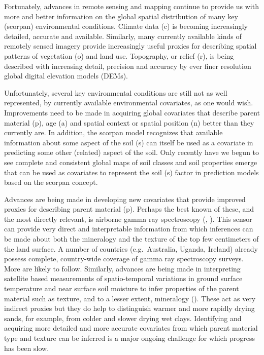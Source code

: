 \documentclass[graybox,natbib,nospthms,UStrade]{svmono}
\begin{document}
Fortunately, advances in remote sensing and mapping continue to provide
us with more and better information on the global spatial distribution
of many key (scorpan) environmental conditions. Climate data (c) is
becoming increasingly detailed, accurate and available. Similarly, many
currently available kinds of remotely sensed imagery provide
increasingly useful proxies for describing spatial patterns of
vegetation (o) and land use. Topography, or relief (r), is being
described with increasing detail, precision and accuracy by ever finer
resolution global digital elevation models (DEMs).

Unfortunately, several key environmental conditions are still not as
well represented, by currently available environmental covariates, as
one would wish. Improvements need to be made in acquiring global
covariates that describe parent material (p), age (a) and spatial
context or spatial position (n) better than they currently are. In
addition, the scorpan model recognizes that available information about
some aspect of the soil (s) can itself be used as a covariate in
predicting some other (related) aspect of the soil. Only recently have
we begun to see complete and consistent global maps of soil classes and
soil properties emerge that can be used as covariates to represent the
soil (s) factor in prediction models based on the scorpan concept.

Advances are being made in developing new covariates that provide
improved proxies for describing parent material (p). Perhaps the best
known of these, and the most directly relevant, is airborne gamma ray
spectroscopy (\citet{WilfordAGSO1997}, \citet{VascarraRosselEJSS2007}). This sensor can provide very direct and interpretable
information from which inferences can be made about both the mineralogy
and the texture of the top few centimeters of the land surface. A number
of countries (e.g.~Australia, Uganda, Ireland) already possess complete,
country-wide coverage of gamma ray spectroscopy surveys. More are likely
to follow. Similarly, advances are being made in interpreting satellite
based measurements of spatio-temporal variations in ground surface
temperature and near surface soil moisture to infer properties of the
parent material such as texture, and to a lesser extent, mineralogy (\citet{LiuGeoderma2012}).
These act as very indirect proxies but they do help to distinguish
warmer and more rapidly drying sands, for example, from colder and
slower drying wet clays. Identifying and acquiring more detailed and
more accurate covariates from which parent material type and texture can
be inferred is a major ongoing challenge for which progress has been
slow.
\end{document}
